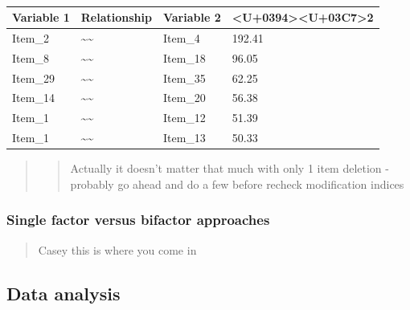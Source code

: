\documentclass[
  english,
  man]{apa6}
\begin{document}
\begin{table}[tbp]

\begin{center}
\begin{threeparttable}

\caption{\label{tab:unnamed-chunk-1}}

\begin{tabular}{llll}
\toprule
Variable 1 & \multicolumn{1}{c}{Relationship} & \multicolumn{1}{c}{Variable 2} & \multicolumn{1}{c}{<U+0394><U+03C7>2}\\
\midrule
Item\_2 & \textasciitilde{}\textasciitilde{} & Item\_4 & 192.41\\
Item\_8 & \textasciitilde{}\textasciitilde{} & Item\_18 & 96.05\\
Item\_29 & \textasciitilde{}\textasciitilde{} & Item\_35 & 62.25\\
Item\_14 & \textasciitilde{}\textasciitilde{} & Item\_20 & 56.38\\
Item\_1 & \textasciitilde{}\textasciitilde{} & Item\_12 & 51.39\\
Item\_1 & \textasciitilde{}\textasciitilde{} & Item\_13 & 50.33\\
\bottomrule
\end{tabular}

\end{threeparttable}
\end{center}

\end{table}

\begin{quote}
\begin{quote}
Actually it doesn't matter that much with only 1 item deletion - probably go ahead and do a few before recheck modification indices
\end{quote}
\end{quote}

\hypertarget{single-factor-versus-bifactor-approaches}{%
\subsubsection{Single factor versus bifactor approaches}\label{single-factor-versus-bifactor-approaches}}

\begin{quote}
Casey this is where you come in
\end{quote}

\hypertarget{data-analysis}{%
\subsection{Data analysis}\label{data-analysis}}
\end{document}
